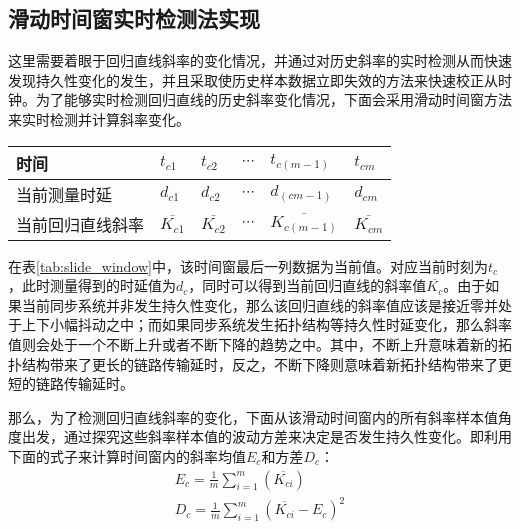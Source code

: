 \subsection{滑动时间窗实时检测法实现}
这里需要着眼于回归直线斜率的变化情况，并通过对历史斜率的实时检测从而快速发现持久性变化的发生，并且采取使历史样本数据立即失效的方法来快速校正从时钟。为了能够实时检测回归直线的历史斜率变化情况，下面会采用滑动时间窗方法来实时检测并计算斜率变化。
\begin{table}[!hpb]
  \centering
  \begin{tabular}{llllll} \toprule
  	时间 & $t_{c1}$ & $t_{c2}$ & $\cdots$ & $t_{c(m-1)}$ & $t_{cm}$ \\ \midrule
    当前测量时延 & $d_{c1}$ & $d_{c2}$ & $\cdots$ & $d_{(cm-1)}$ & $d_{cm}$ \\ \midrule
    当前回归直线斜率 & $\overline{K_{c1}}$ & $\overline{K_{c2}}$ & $\cdots$ & $\overline{K_{c(m-1)}}$ & $\overline{K_{cm}}$  \\ \bottomrule
  \end{tabular}
\end{table}

在表\ref{tab:slide_window}中，该时间窗最后一列数据为当前值。对应当前时刻为$t_{c}$，此时测量得到的时延值为$d_{c}$，同时可以得到当前回归直线的斜率值$\overline{K_{c}}$。由于如果当前同步系统并非发生持久性变化，那么该回归直线的斜率值应该是接近零并处于上下小幅抖动之中；而如果同步系统发生拓扑结构等持久性时延变化，那么斜率值则会处于一个不断上升或者不断下降的趋势之中。其中，不断上升意味着新的拓扑结构带来了更长的链路传输延时，反之，不断下降则意味着新拓扑结构带来了更短的链路传输延时。

那么，为了检测回归直线斜率的变化，下面从该滑动时间窗内的所有斜率样本值角度出发，通过探究这些斜率样本值的波动方差来决定是否发生持久性变化。即利用下面的式子来计算时间窗内的斜率均值$E_{c}$和方差$D_{c}$：
\begin{align}
E_{c} = \frac{1}{m}\sum_{i=1}^{m}(\overline{K_{ci}}) \\
D_{c} = \frac{1}{m}\sum_{i=1}^{m}(\overline{K_{ci}} - E_{c}) ^ {2}
\end{align}

